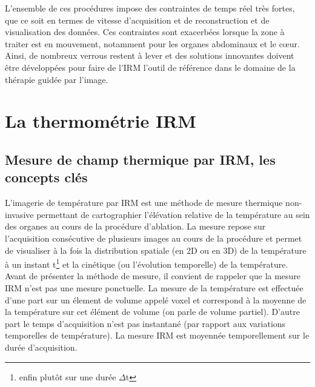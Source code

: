 
L’ensemble de ces procédures impose des contraintes de temps réel très fortes, que ce soit en termes de vitesse d’acquisition et de reconstruction et de visualisation des données. Ces contraintes sont exacerbées lorsque la zone à traiter est en mouvement, notamment pour les organes abdominaux et le cœur. Ainsi, de nombreux verrous restent à lever et des solutions innovantes doivent être développées pour faire de l’IRM l’outil de référence dans le domaine de la thérapie guidée par l’image.

\section{La thermométrie IRM}
\label{chap1-thermometrie}

\subsection{Mesure de champ thermique par IRM, les concepts clés}

L'imagerie de température par IRM est une méthode de mesure thermique non-invasive permettant de cartographier l'élévation relative de la température au sein des organes au cours de la procédure d'ablation. La mesure repose sur l'acquisition consécutive de plusieurs images au cours de la procédure et permet de visualiser à la fois la distribution spatiale (en 2D ou en 3D) de la température à un instant t\footnote{enfin plutôt sur une durée $\Delta$t} et la cinétique (ou l'évolution temporelle) de la température. Avant de présenter la méthode de mesure, il convient de rappeler que la mesure IRM n'est pas une mesure ponctuelle. La mesure de la température est effectuée d'une part sur un élement de volume appelé voxel et correspond à la moyenne de la température sur cet élément de volume (on parle de volume partiel). D'autre part le temps d'acquisition n'est pas instantané (par rapport aux variations temporelles de température). La mesure IRM est moyennée temporellement sur le durée d'acquisition. \\
